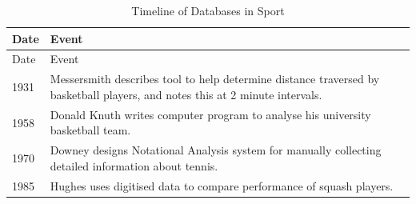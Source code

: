 \begin{longtable}[c]{@{}ll@{}}
\caption{Timeline of Databases in Sport \label{tab:db}}\tabularnewline
\toprule
\begin{minipage}[b]{0.09\columnwidth}\raggedright\strut
Date
\strut\end{minipage} &
\begin{minipage}[b]{0.65\columnwidth}\raggedright\strut
Event
\strut\end{minipage}\tabularnewline
\midrule
\endfirsthead
\toprule
\begin{minipage}[b]{0.09\columnwidth}\raggedright\strut
Date
\strut\end{minipage} &
\begin{minipage}[b]{0.65\columnwidth}\raggedright\strut
Event
\strut\end{minipage}\tabularnewline
\midrule
\endhead
\begin{minipage}[t]{0.09\columnwidth}\raggedright\strut
1931
\strut\end{minipage} &
\begin{minipage}[t]{0.65\columnwidth}\raggedright\strut
Messersmith describes tool to help determine distance traversed by basketball players, and notes this at 2 minute intervals.
\strut\end{minipage}\tabularnewline
\begin{minipage}[t]{0.09\columnwidth}\raggedright\strut
1958
\strut\end{minipage} &
\begin{minipage}[t]{0.65\columnwidth}\raggedright\strut
Donald Knuth writes computer program to analyse his university basketball team.
\strut\end{minipage}\tabularnewline
\begin{minipage}[t]{0.09\columnwidth}\raggedright\strut
1970
\strut\end{minipage} &
\begin{minipage}[t]{0.65\columnwidth}\raggedright\strut
Downey designs Notational Analysis system for manually collecting
detailed information about tennis.
\strut\end{minipage}\tabularnewline
\begin{minipage}[t]{0.09\columnwidth}\raggedright\strut
1985
\strut\end{minipage} &
\begin{minipage}[t]{0.65\columnwidth}\raggedright\strut
Hughes uses digitised data to compare performance of squash players.
\strut\end{minipage}\tabularnewline

\end{longtable}
